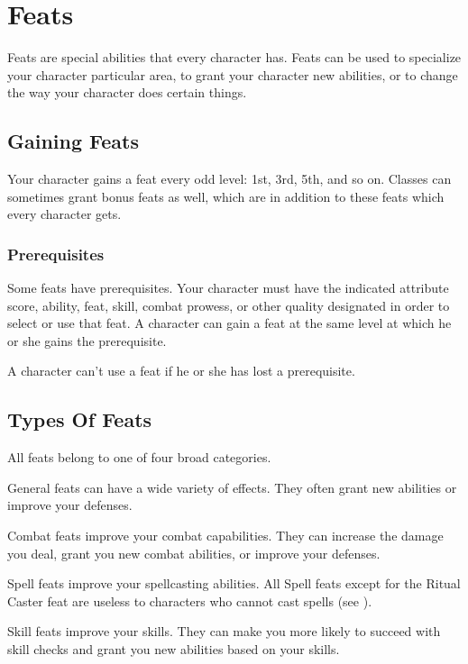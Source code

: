 \chapter{Feats}\label{Feats}

Feats are special abilities that every character has.
Feats can be used to specialize your character particular area, to grant your character new abilities, or to change the way your character does certain things.

\section{Gaining Feats}
    Your character gains a feat every odd level: 1st, 3rd, 5th, and so on.
    Classes can sometimes grant bonus feats as well, which are in addition to these feats which every character gets.

    \subsection{Prerequisites}
        Some feats have prerequisites.
        Your character must have the indicated attribute score, ability, feat, skill, combat prowess, or other quality designated in order to select or use that feat.
        A character can gain a feat at the same level at which he or she gains the prerequisite.

        A character can't use a feat if he or she has lost a prerequisite.

\section{Types Of Feats}
    All feats belong to one of four broad categories.

     General feats can have a wide variety of effects.
    They often grant new abilities or improve your defenses.

     Combat feats improve your combat capabilities.
    They can increase the damage you deal, grant you new combat abilities, or improve your defenses.

     Spell feats improve your spellcasting abilities.
    All Spell feats except for the Ritual Caster feat are useless to characters who cannot cast spells (see ).

     Skill feats improve your skills.
    They can make you more likely to succeed with skill checks and grant you new abilities based on your skills.

